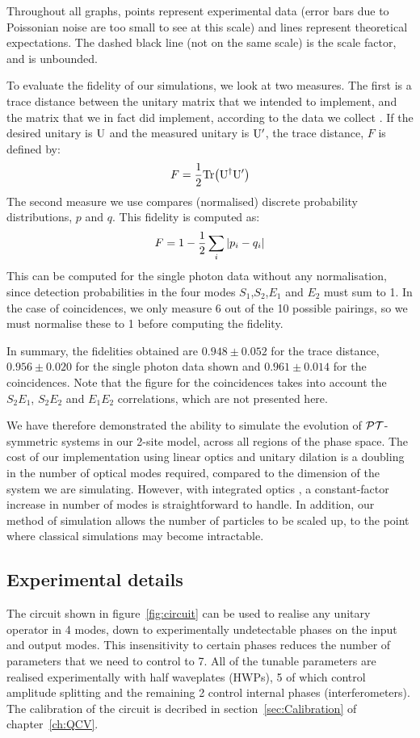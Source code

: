 Throughout all graphs, points represent experimental data (error bars due to
Poissonian noise are too small to see at this scale) and lines represent
theoretical expectations. The dashed black line (not on the same scale) is the
scale factor, and is unbounded.

To evaluate the fidelity of our simulations, we look at two measures. The first
is a trace distance between the unitary matrix that we intended to implement,
and the matrix that we in fact did implement, according to the data we collect
. If the desired unitary is \(\mathrm{U}\) and the measured unitary
is \(\mathrm{U^{\prime}}\), the trace distance, \(F\) is defined by:
\[F=\frac{1}{2}\mathrm{Tr}\!\left(\mathrm{U}^{\dagger}{\mathrm{U}^{\prime}}\right)\]
The second measure we use compares (normalised) discrete probability
distributions, \(p\) and \(q\). This fidelity is computed as:
\[F=1-\frac{1}{2}\sum_{i}\left|p_{i}-q_{i}\right|\]
This can be computed for the single photon data without any normalisation, since
detection probabilities in the four modes \(S_1\),\(S_2\),\(E_1\) and \(E_2\)
must sum to 1. In the case of coincidences, we only measure 6 out of the 10
possible pairings, so we must normalise these to 1 before computing the
fidelity.

In summary, the fidelities obtained are \(0.948 \pm 0.052\) for the trace
distance, \(0.956 \pm 0.020\) for the single photon data shown and \(0.961 \pm
0.014\) for the coincidences. Note that the figure for the coincidences takes
into account the \(S_2 E_1\), \(S_2 E_2\) and \(E_1 E_2\) correlations, which
are not presented here.

We have therefore demonstrated the ability to simulate the evolution of
\(\mathcal{PT}{}\)-symmetric systems in our 2-site model, across all regions of the phase
space. The cost of our implementation using linear optics and unitary dilation
is a doubling in the number of optical modes required, compared to the dimension
of the system we are simulating. However, with integrated optics
, a constant-factor increase in number of modes is
straightforward to handle. In addition, our method of simulation allows the
number of particles to be scaled up, to the point where classical simulations
may become intractable.

\subsection{Experimental details}
\label{sec:SimulationExperiment}
The circuit shown in figure~\ref{fig:circuit} can be used to realise any
unitary operator in 4 modes, down to experimentally undetectable phases on the
input and output modes. This insensitivity to certain phases reduces the number
of parameters that we need to control to 7. All of the tunable parameters are
realised experimentally with half waveplates (HWPs), 5 of which control
amplitude splitting and the remaining 2 control internal phases
(interferometers). The calibration of the circuit is decribed in
section~\ref{sec:Calibration} of chapter~\ref{ch:QCV}.

